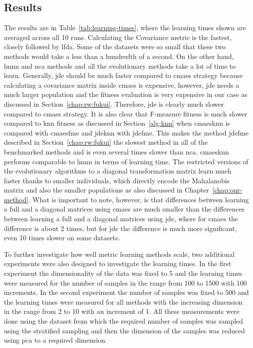 \documentclass[12pt,a4paper]{report}
\begin{document}
\subsection{Results}

The results are in Table~\ref{tab:learning-times}, where the learning times shown are averaged across all 10 runs. Calculating the Covariance metric is the fastest, closely followed by \ac{lfda}. Some of the datasets were so small that these two methods would take a less than a hundredth of a second. On the other hand, \ac{lmnn} and \ac{nca} methods and all the evolutionary methods take a lot of time to learn. Generally, \ac{jde} should be much faster compared to \ac{cmaes} strategy because calculating a covariance matrix inside \ac{cmaes} is expensive, however, \ac{jde} needs a much larger population and the fitness evaluation is very expensive in our case as discussed in Section~\ref{chap:rw:fukui}. Therefore, \ac{jde} is clearly much slower compared to \ac{cmaes} strategy. It is also clear that F-measure fitness is much slower compared to \ac{knn} fitness as discussed in Section~\ref{alg:knn} when \ac{cmaesknn} is compared with \ac{cmaesfme} and \ac{jdeknn} with \ac{jdefme}. This makes the method \ac{jdefme} described in Section~\ref{chap:rw:fukui} the slowest method in all of the benchmarked methods and is even several times slower than \ac{nca}. \ac{cmaesknn} performs comparable to \ac{lmnn} in terms of learning time. The restricted versions of the evolutionary algorithms to a diagonal transformation matrix learn much faster thanks to smaller individuals, which directly encode the Mahalanobis matrix and also the smaller populations as also discussed in Chapter~\ref{chap:our-method}. What is important to note, however, is that differences between learning a full and a diagonal matrices using \ac{cmaes} are much smaller than the differences between learning a full and a diagonal matrices using \ac{jde}, where for \ac{cmaes} the difference is about 2 times, but for \ac{jde} the difference is much more significant, even 10 times slower on some datasets.



To further investigate how well metric learning methods scale, two additional experiments were also designed to investigate the learning times. In the first experiment the dimensionality of the data was fixed to 5 and the learning times were measured for the number of samples in the range from 100 to 1500 with 100 increments. In the second experiment the number of samples was fixed to 500 and the learning times were measured for all methods with the increasing dimension in the range from 2 to 10 with an increment of 1. All these measurements were done using the  dataset from which the required number of samples was sampled using the stratified sampling and then the dimension of the samples was reduced using \ac{pca} to a required dimension.
\end{document}
